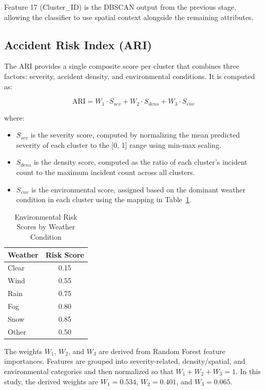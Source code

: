 \documentclass[conference]{IEEEtran}
\begin{document}
Feature 17 (Cluster\_ID) is the DBSCAN output from the previous stage, allowing the classifier to use spatial context alongside the remaining attributes.

\subsection{Accident Risk Index (ARI)}

The ARI provides a single composite score per cluster that combines three factors: severity, accident density, and environmental conditions. It is computed as:

\begin{equation}
\text{ARI} = W_1 \cdot S_{sev} + W_2 \cdot S_{dens} + W_3 \cdot S_{env}
\label{eq:ari}
\end{equation}

\noindent where:

\begin{itemize}
\item $S_{sev}$ is the severity score, computed by normalizing the mean predicted severity of each cluster to the [0, 1] range using min-max scaling.
\item $S_{dens}$ is the density score, computed as the ratio of each cluster's incident count to the maximum incident count across all clusters.
\item $S_{env}$ is the environmental score, assigned based on the dominant weather condition in each cluster using the mapping in Table~\ref{tab:env_scores}.
\end{itemize}

\begin{table}[htbp]
\caption{Environmental Risk Scores by Weather Condition}
\begin{center}
\begin{tabular}{lc}
\toprule
\textbf{Weather} & \textbf{Risk Score} \\
\midrule
Clear & 0.15 \\
Wind & 0.55 \\
Rain & 0.75 \\
Fog & 0.80 \\
Snow & 0.85 \\
Other & 0.50 \\
\bottomrule
\end{tabular}
\label{tab:env_scores}
\end{center}
\end{table}

The weights $W_1$, $W_2$, and $W_3$ are derived from Random Forest feature importances. Features are grouped into severity-related, density/spatial, and environmental categories and then normalized so that $W_1 + W_2 + W_3 = 1$. In this study, the derived weights are $W_1 = 0.534$, $W_2 = 0.401$, and $W_3 = 0.065$.
\end{document}
